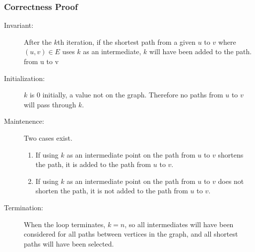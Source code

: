 \documentclass[a4paper,12pt]{article}
\begin{document}
\subsubsection{Correctness Proof}
\begin{description}
\item [Invariant: ] After the $k$th iteration, if the shortest path from a given $u$ to $v$ where $(u,v)\in E$ uses $k$ as an intermediate, $k$ will have been added to the path.
  from u to v
\item [Initialization: ] $k$ is 0 initially, a value not on the graph. Therefore no paths from $u$ to $v$ will pass through $k$.
\item [Maintenence: ] Two cases exist.
  \begin{enumerate}
  \item If using $k$ as an intermediate point on the path from $u$ to $v$ shortens the path, it is added to the path from $u$ to $v$.
  \item If using $k$ as an intermediate point on the path from $u$ to $v$ does not shorten the path, it is not added to the path from $u$ to $v$.
  \end{enumerate}
\item [Termination: ] When the loop terminates, $k = n$, so all intermediates will have been considered for all paths between vertices in the graph, and all shortest
  paths will have been selected.
\end{description}
\end{document}
